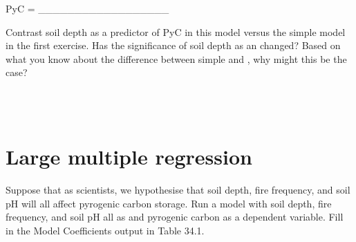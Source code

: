 \documentclass[
  openany]{krantz}
\begin{document}
PyC = \_\_\_\_\_\_\_\_\_\_\_\_\_\_\_\_\_\_

Contrast soil depth as a predictor of PyC in this  model versus the simple  model in the first exercise.
Has the significance of soil depth as an  changed?
Based on what you know about the difference between simple  and , why might this be the case?

\begin{verbatim}



\end{verbatim}

\hypertarget{large-multiple-regression}{%
\section{Large multiple regression}\label{large-multiple-regression}}

Suppose that as scientists, we hypothesise that soil depth, fire frequency, and soil pH will all affect pyrogenic carbon storage.
Run a  model with soil depth, fire frequency, and soil pH all as  and pyrogenic carbon as a dependent variable.
Fill in the Model Coefficients output in Table 34.1.
\end{document}
